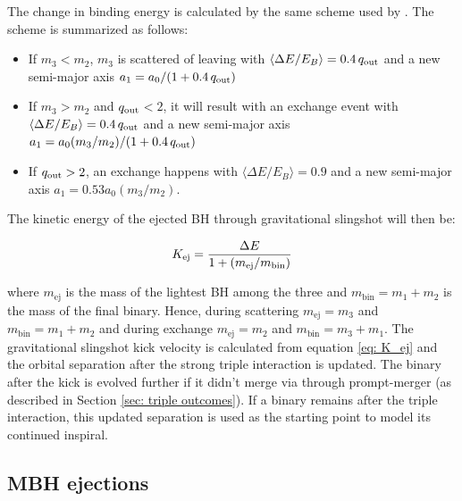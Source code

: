 \documentclass[twocolumn,linenumbers]{aastex701}
\newcommand{\qout}{$q_{\rm out}$}
\begin{document}
The change in binding energy is calculated by the same scheme used by \cite{volonteri_assembly_2003}. The scheme is summarized as follows:

\begin{itemize}
    \item If $m_3<m_2$, $m_3$ is scattered of leaving with $\langle\Delta E/ E_B\rangle = 0.4 \, q_{\rm out}$  and a new semi-major axis $a_1 = a_0/(1+0.4 \, q_{\rm out})$
    \item If $m_3 > m_2$ and \qout $< 2$, it will result with an exchange event with $\langle\Delta E/ E_B\rangle = 0.4 \, q_{\rm out}$ 
    and a new semi-major axis $a_1 = a_0 (m_3/m_2)/(1+0.4 \, q_{\rm out})$
    \item If $q_{\rm out} > 2$, an exchange happens with $\langle\Delta E/ E_B\rangle = 0.9$ and a new semi-major axis $a_1 = 0.53 a_0 (m_3/m_2)$.
\end{itemize}

The kinetic energy of the ejected BH through gravitational slingshot will then be:

\begin{equation}
    K_{\rm ej} = \frac{\Delta E}{1 + (m_{\rm ej}/m_{\rm bin})}
    \label{eq: K_ej}
\end{equation}

where $m_{\text{ej}}$ is the mass of the lightest BH among the three and $m_{\text{bin}} = m_1 + m_2$ is the mass of the final binary. Hence, during scattering $m_{\text{ej}} = m_{3}$ and $m_{\text{bin}} = m_1 + m_2$ and during exchange  $m_{\text{ej}} = m_{2}$ and $m_{\text{bin}} = m_3 + m_1$. The gravitational slingshot kick velocity is calculated from equation \ref{eq: K_ej} and the orbital separation after the strong triple interaction is updated. The binary after the kick is evolved further if it didn't merge via through prompt-merger (as described in Section \ref{sec: triple outcomes}). If a binary remains after the triple interaction, this updated separation is used as the starting point to model its continued inspiral.

\subsection{MBH ejections}
\label{sec: BH ejections}
\end{document}
